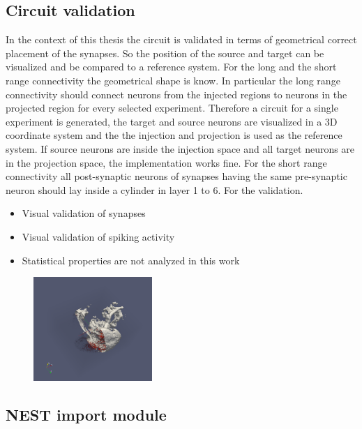 \documentclass[a4paper]{article}
\begin{document}
\subsection{Circuit validation}

In the context of this thesis the circuit is validated in terms of geometrical correct placement of
the synapses. So the position of the source and target can be visualized and be compared to a 
reference system. For the long and the short range connectivity the geometrical shape is know.
In particular the long range connectivity should connect neurons from the injected regions to neurons
in the projected region for every selected experiment. Therefore a circuit for a single experiment is 
generated, the target and source neurons are visualized in a 3D coordinate system and the the injection
and projection is used as the reference system. If source neurons are inside the injection space and all
target neurons are in the projection space, the implementation works fine.
For the short range connectivity all post-synaptic neurons of synapses having the same pre-synaptic neuron should
lay inside a cylinder in layer 1 to 6. For the validation. 
 
\begin{itemize}
      \item Visual validation of synapses
      \item Visual validation of spiking activity
      \item Statistical properties are not analyzed in this work 
\end{itemize}

\begin{figure}[ht!]
\centering
\includegraphics[width=0.4\textwidth]{paraview_ex.png}
\end{figure}

\subsection{NEST import module}
\end{document}
